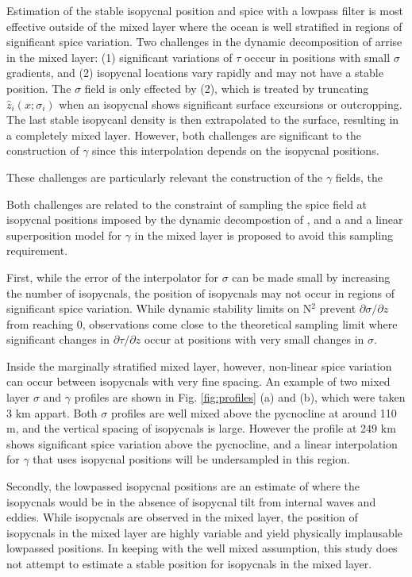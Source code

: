 \documentclass[preprint,NumberedRefs]{JASA}
\begin{document}
Estimation of the stable isopycnal position and spice with a lowpass filter is most effective outside of the mixed layer where the ocean is well stratified in regions of significant spice variation. Two challenges in the dynamic decomposition of \citep{dzieciuch2004} arrise in the mixed layer: (1) significant variations of $\tau$ occcur in positions with small $\sigma$ gradients, and (2) isopycnal locations vary rapidly and may not have a stable position. The $\sigma$ field is only effected by (2), which is treated by truncating $\hat{z}_i(x; \sigma_i)$ when an isopycnal shows significant surface excursions or outcropping. The last stable isopycanl density is then extrapolated to the surface, resulting in a completely mixed layer. However, both challenges are significant to the construction of $\gamma$ since this interpolation depends on the isopycnal positions.

These challenges are particularly relevant the construction of the $\gamma$ fields, the 

Both challenges are related to the constraint of sampling the spice field at isopycnal positions imposed by the dynamic decompostion of \citep{dzieciuch2004}, and a and a linear superposition model for $\gamma$ in the mixed layer is proposed to avoid this sampling requirement.

First, while the error of the interpolator for $\sigma$ can be made small by increasing the number of isopycnals, the position of isopycnals may not occur in regions of significant spice variation. While dynamic stability limits on N$^2$ prevent $\partial \sigma / \partial z$ from reaching 0, observations come close to the theoretical sampling limit where significant changes in $\partial \tau / \partial z$ occur at positions with very small changes in $\sigma$.


 Inside the marginally stratified mixed layer, however, non-linear spice variation can occur between isopycnals with very fine spacing. An example of two mixed layer $\sigma$ and $\gamma$ profiles are shown in Fig. \ref{fig:profiles} (a) and (b), which were taken 3 km appart. Both $\sigma$ profiles are well mixed above the pycnocline at around 110 m, and the vertical spacing of isopycnals is large. However the profile at 249 km shows significant spice variation above the pycnocline, and a linear interpolation for $\gamma$ that uses isopycnal positions will be undersampled in this region.

Secondly, the lowpassed isopycnal positions are an estimate of where the isopycnals would be in the absence of isopycnal tilt from internal waves and eddies. While isopycnals are observed in the mixed layer, the position of isopycnals in the mixed layer are highly variable and yield physically implausable lowpassed positions. In keeping with the well mixed assumption, this study does not attempt to estimate a stable position for isopycnals in the mixed layer.
\end{document}
